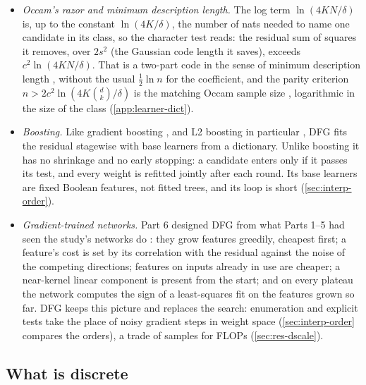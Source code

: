 \begin{itemize}
\item \emph{Occam's razor and minimum description length.} The log term $\ln(4KN/\delta)$ is, up to the constant $\ln(4K/\delta)$, the number of nats needed to name one candidate in its class, so the character test reads: the residual sum of squares it removes, over $2s^2$ (the Gaussian code length it saves), exceeds $c^2\ln(4KN/\delta)$. That is a two-part code in the sense of minimum description length \cite{rissanen1978modeling}, without the usual $\frac12\ln n$ for the coefficient, and the parity criterion $n>2c^2\ln(4K\binom dk/\delta)$ is the matching Occam sample size \cite{blumer1987occam}, logarithmic in the size of the class (\cref{app:learner-dict}).
\item \emph{Boosting.} Like gradient boosting \cite{friedman2001greedy}, and L2 boosting in particular \cite{buhlmann2003boosting}, DFG fits the residual stagewise with base learners from a dictionary. Unlike boosting it has no shrinkage and no early stopping: a candidate enters only if it passes its test, and every weight is refitted jointly after each round. Its base learners are fixed Boolean features, not fitted trees, and its loop is short (\cref{sec:interp-order}).
\item \emph{Gradient-trained networks.} Part 6 designed DFG from what Parts 1--5 had seen the study's networks do \cite{gdcircuit2026,discretelearners2026}: they grow features greedily, cheapest first; a feature's cost is set by its correlation with the residual against the noise of the competing directions; features on inputs already in use are cheaper; a near-kernel linear component is present from the start; and on every plateau the network computes the sign of a least-squares fit on the features grown so far. DFG keeps this picture and replaces the search: enumeration and explicit tests take the place of noisy gradient steps in weight space (\cref{sec:interp-order} compares the orders), a trade of samples for FLOPs (\cref{sec:res-dscale}).
\end{itemize}

\subsection{What is discrete}\label{sec:whatdiscrete}


